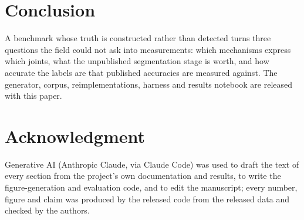 \documentclass[letterpaper, 10 pt, conference]{ieeeconf}
\begin{document}
\section{Conclusion}
A benchmark whose truth is constructed rather than detected turns three questions the field could not ask into measurements: which mechanisms express which joints, what the unpublished segmentation stage is worth, and how accurate the labels are that published accuracies are measured against. The generator, corpus, reimplementations, harness and results notebook are released with this paper.

\section*{Acknowledgment}
Generative AI (Anthropic Claude, via Claude Code) was used to draft the text of every section from the project's own documentation and results, to write the figure-generation and evaluation code, and to edit the manuscript; every number, figure and claim was produced by the released code from the released data and checked by the authors.



\end{document}
